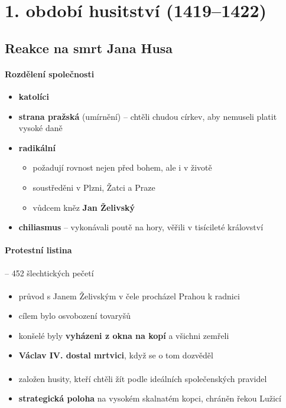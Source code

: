 \section{1. období husitství (1419--1422)} 
\subsection{Reakce na smrt Jana Husa}
\paragraph{Rozdělení společnosti}
\begin{itemize}
\item \textbf{katolíci}
\item \textbf{strana pražská} (umírnění) -- chtěli chudou církev, aby nemuseli platit vysoké daně
\item \textbf{radikální} 
	\begin{itemize}
	\item požadují rovnost nejen před bohem, ale i v životě
	\item soustředěni v Plzni, Žatci a Praze
	\item vůdcem kněz \textbf{Jan Želivský}
	\end{itemize}
\item \textbf{chiliasmus} -- vykonávali poutě na hory, věřili v tisícileté království
\end{itemize}

\paragraph{Protestní listina} -- 452 šlechtických pečetí 

\paragraph{}
\begin{itemize}
\item průvod s Janem Želivským v čele procházel Prahou k radnici
\item cílem bylo osvobození tovaryšů
\item konšelé byly \textbf{vyházeni z okna na kopí} a všichni zemřeli
\item \textbf{Václav IV. dostal mrtvici}, když se o tom dozvěděl
\end{itemize}

\paragraph{}
\begin{itemize}
\item založen husity, kteří chtěli žít podle ideálních společenských pravidel
\item \textbf{strategická poloha} na vysokém skalnatém kopci, chráněn řekou Lužicí
\end{itemize}


